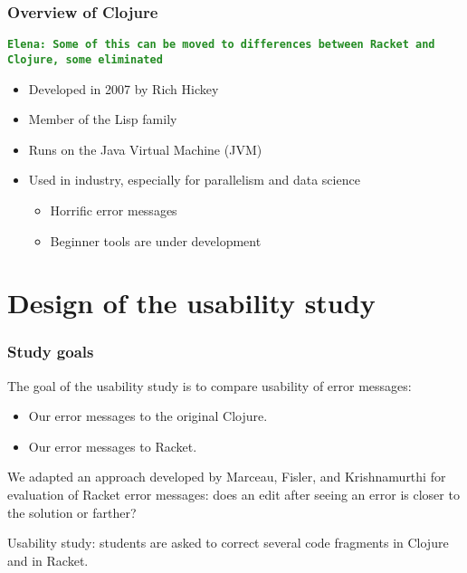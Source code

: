 \documentclass{beamer}
\newcommand{\comment}[1]{{\bf \tt  {#1}}}
\newcommand{\emcomment}[1]{\textcolor{ForestGreen}{\comment{Elena: {#1}}}}
\begin{document}
\begin{frame}
\frametitle{Overview of Clojure}
\emcomment{Some of this can be moved to differences between Racket and Clojure, some eliminated}
	\begin{itemize}
	\item Developed in 2007 by Rich Hickey
	\item Member of the Lisp family
  	\item Runs on the Java Virtual Machine (JVM)
	\item Used in industry, especially for parallelism and data science
		\begin{itemize}
			\item Horrific error messages
			\item Beginner tools are under development
	 \end{itemize}
	 \end{itemize}
\end{frame}





\section{Design of the usability study} 


\begin{frame}
\frametitle{Study goals}
The goal of the usability study is to compare usability of error messages:
\begin{itemize}
\item Our error messages to the original Clojure.
\item Our error messages to Racket.
\end{itemize}
We adapted an approach developed by Marceau, Fisler, and Krishnamurthi for evaluation of Racket error messages: does an edit after seeing an error is closer to the solution or farther? 

\vspace*{.2in}

Usability study: students are asked to correct several code fragments in Clojure and in Racket. 
\end{frame}
\end{document}
